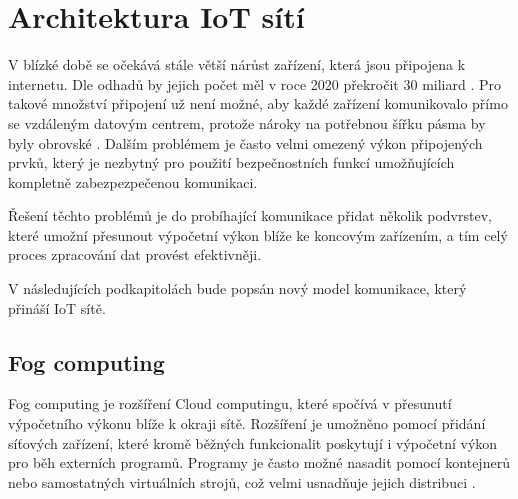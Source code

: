 \section{Architektura IoT sítí}
  V blízké době se očekává stále větší nárůst zařízení, která jsou připojena k internetu.
  Dle odhadů by jejich počet měl v roce 2020 překročit 30 miliard \cite{iotDevices}.
  Pro takové množství připojení už není možné, aby každé zařízení komunikovalo přímo
  se vzdáleným datovým centrem, protože nároky na potřebnou šířku pásma by byly 
  obrovské \cite{fog}.
  Dalším problémem je často velmi omezený výkon připojených prvků, který je nezbytný pro 
  použití bezpečnostních funkcí umožňujících kompletně zabezpezpečenou komunikaci. 
  
  Řešení těchto problémů je do probíhající komunikace přidat několik podvrstev, 
  které umožní přesunout výpočetní výkon blíže ke koncovým zařízením, a tím celý
  proces zpracování dat provést efektivněji.
  
  V následujících podkapitolách bude popsán nový model komunikace, který přináší 
  IoT sítě.
 \subsection{Fog computing} 
 Fog computing je rozšíření Cloud computingu, které spočívá v přesunutí výpočetního
 výkonu blíže k okraji sítě. Rozšíření je umožněno pomocí přidání síťových zařízení,
 které kromě běžných funkcionalit poskytují i výpočetní výkon pro běh externích programů. Programy 
 je často možné nasadit pomocí kontejnerů nebo samostatných virtuálních strojů, což 
 velmi usnadňuje jejich distribuci \cite{fog}.
 
